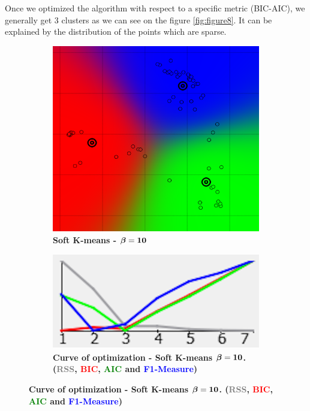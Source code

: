 Once we optimized the algorithm with respect to a specific metric (BIC-AIC), we generally get 3 clusters as we can see on the figure \ref{fig:figure8}. It can be explained by the distribution of the points which are sparse.

\begin{figure} [ht]
\centering
	\begin{subfigure}[t]{0.25\textwidth}
    \centering
	\includegraphics[height=0.15\textheight]{./clustering/opt_AIC_k_soft_beta_10_range7.png}
	\caption{\bf Soft K-means - $\boldsymbol \beta \bf=10$}
	\end{subfigure}
    \hspace{20mm}
    \begin{subfigure}[t]{0.50\textwidth}
	\includegraphics[height=0.15\textheight,right]{./clustering/curve_opt_AIC_k_soft_beta_10_range7.png}
	\caption{\bf Curve of optimization - Soft K-means $\boldsymbol \beta \bf = 10$. (\textcolor{gray}{RSS}, \textcolor{red}{BIC}, \textcolor{green}{AIC} and \textcolor{blue}{F1-Measure})}

\end{subfigure}
\end{figure}
